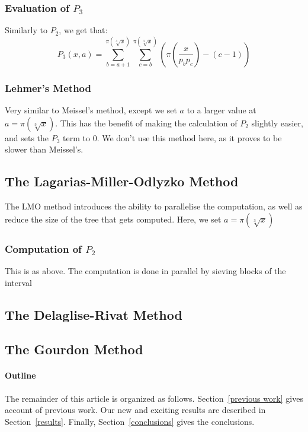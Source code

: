 \documentclass[12pt]{article}
\begin{document}
\subsubsection*{Evaluation of $P_3$}
Similarly to $P_2$, we get that:
\begin{equation*}
  P_3(x,a)
    =\sum_{b=a+1}^{\pi(\sqrt[3]{x})}\sum_{c=b}^{\pi(\sqrt[3]{x})}\left(\pi\left(\frac{x}{p_bp_c}\right) - (c - 1)\right)
  \end{equation*}

\subsubsection{Lehmer's Method}
Very similar to Meissel's method, except we set $a$ to a larger value at $a=\pi\left(\sqrt[3]{x}\right)$. This
has the benefit of making the calculation of $P_2$ slightly easier, and sets the $P_3$ term to 0. We don't
use this method here, as it proves to be slower than Meissel's.

\subsection{The Lagarias-Miller-Odlyzko Method}
The LMO method introduces the ability to parallelise the computation, as well as reduce the size
of the tree that gets computed. Here, we set $a=\pi\left(\sqrt[3]{x}\right)$

\subsubsection{Computation of $P_2$}
This is as above. The computation is done in parallel by sieving blocks of the interval 

\subsection{The Delaglise-Rivat Method}

\subsection{The Gourdon Method}

\paragraph{Outline}
The remainder of this article is organized as follows.
Section~\ref{previous work} gives account of previous work.
Our new and exciting results are described in Section~\ref{results}.
Finally, Section~\ref{conclusions} gives the conclusions.
\end{document}
